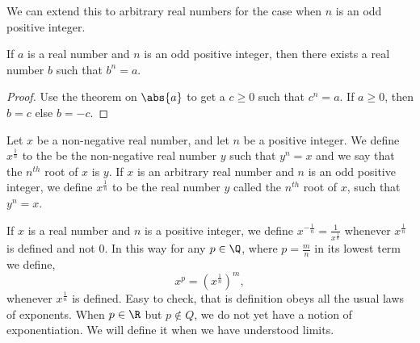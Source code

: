 We can extend this to arbitrary real numbers for the case when $n$ is an odd positive integer.
\begin{Corollary}
    If $a$ is a real number and $n$ is an odd positive integer, then there exists a real number $b$ such that 
    $b^n = a$.
\end{Corollary}
\begin{proof}
    Use the theorem on $\abs{a}$ to get a $c \geq 0$ such that $c^n = a$. If $a \geq 0$, then $b = c$ else 
    $b = -c$.
\end{proof}
\begin{Definition}[name=root]
    Let $x$ be a non-negative real number, and let $n$ be a positive integer. We define $x^{\frac{1}{n}}$ to
    the be the non-negative real number $y$ such that $y^n = x$ and we say that the $n^{th}$ root of $x$ is
    $y$. If $x$ is an arbitrary real number and $n$ is an odd positive integer, we define $x^{\frac{1}{n}}$ to
    be the real number $y$ called the $n^{th}$ root of $x$, such that $y^n = x$.
\end{Definition}
If $x$ is a real number and $n$ is a positive integer, we define
$x^{-\frac{1}{n}} = \frac{1}{x^{\frac{1}{n}}}$ whenever $x^{\frac{1}{n}}$ is defined and not $0$.
In this way for any $p \in \Q$, where $p = \frac{m}{n}$ in its lowest term we define,
\[x^{p} = {(x^{\frac{1}{n}})}^{m},\]
whenever $x^{\frac{1}{n}}$ is defined. Easy to check, that is definition obeys all the usual laws of
exponents. When $p \in \R$ but $p \not\in Q$, we do not yet have a notion of exponentiation. We will define it
when we have understood limits.


